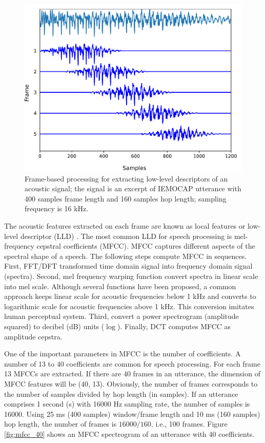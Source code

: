 \begin{figure}[htbp]
  \centering
  \includegraphics[width=\textwidth]{../fig/framing.pdf}  
  \caption{Frame-based processing for extracting low-level descriptors of an acoustic signal; the signal is an excerpt of IEMOCAP utterance with 400 samples frame length and 160 samples hop length; sampling frequency is 16 kHz.}
  \label{fig:frame-processing}
\end{figure}

The acoustic features extracted on each frame are known as local features or
low-level descriptor (LLD) \cite{Herrera1999}. The most common LLD for speech
processing is mel-frequency cepstral coefficients (MFCC). MFCC captures
different aspects of the spectral shape of a speech. The following steps
compute MFCC in sequences. First, FFT/DFT transformed time domain signal into
frequency domain signal (spectra). Second, mel frequency warping function
convert spectra in linear scale into mel scale. Although several functions have
been proposed, a common approach keeps linear scale for acoustic frequencies
below 1 kHz and converts to logarithmic scale for acoustic frequencies above 1
kHz. This conversion imitates human perceptual system. Third, convert a power
spectrogram (amplitude squared) to decibel (dB) units ($\log$). Finally, DCT
computes MFCC as amplitude cepstra.

One of the important parameters in MFCC is the number of coefficients. A number
of 13 to 40 coefficients are common for speech processing. For
each frame 13 MFCCs are extracted. If there are 40 frames in an utterance, the
dimension of MFCC features will be (40, 13). Obviously, the number of frames
corresponds to the number of samples divided by hop length (in samples). 
If an utterance comprises 1 second (s) with 16000 Hz sampling rate, the
number of samples is 16000. Using 25 ms (400 samples) window/frame length and
10 ms (160 samples) hop length, the number of frames is $16000/160$, i.e.,
100 frames. Figure \ref{fig:mfcc_40} shows an MFCC spectrogram of an utterance
with 40 coefficients.

